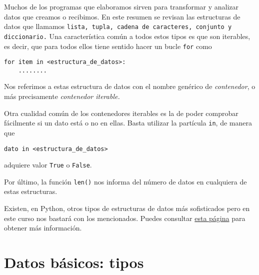 
Muchos de los programas que elaboramos sirven para transformar y analizar
datos que creamos o recibimos. En este resumen se revisan  las
estructuras de
datos que llamamos {\tt lista, tupla, cadena de caracteres, conjunto y
diccionario.} Una
característica común a todos estos tipos es que son {\sc iterables,} es decir,
\label{iterable}
que para
todos ellos tiene
sentido hacer un bucle \lstinline|for|  como
\begin{lstlisting}[numbers=none]
for item in <estructura_de_datos>:
	........
\end{lstlisting}

Nos referimos a estas  estructura de datos con el nombre gen\'erico de
{\itshape contenedor}, o m\'as precisamente {\itshape contenedor iterable.}






Otra cualidad común de los contenedores iterables  es la de poder comprobar
f\'acilmente si un
dato está o
no en ellas. Basta utilizar la partícula \lstinline|in|, de manera que
\begin{lstlisting}
dato in <estructura_de_datos>
\end{lstlisting} 
adquiere valor \lstinline|True| o \lstinline|False|.

Por último, la función \lstinline|len()| nos informa del número de datos en
cualquiera de  estas estructuras. 

Existen, en Python, otros tipos de estructuras de datos m\'as sofisticados pero en este curso nos bastar\'a con los mencionados. Puedes consultar \href{http://interactivepython.org/runestone/static/pythonds/index.html}{esta p\'agina} para obtener m\'as informaci\'on. 


\section{Datos b\'asicos: tipos}

